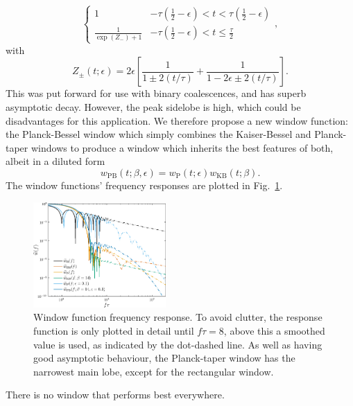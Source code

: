 \documentclass[useAMS,usedcolumn,usegraphicx,usenatbib]{mn2e}
\newcommand{\figref}[1]{Fig.~\ref{fig:#1}}
\newcommand{\sub}[1]{\ensuremath{_\mathrm{#1}}}
\newcommand{\recip}[1]{\ensuremath{\frac{1}{#1}}}
\begin{document}
{\begin{equation}
\begin{cases}
 1 & {\displaystyle -\tau\left(\recip{2} - \epsilon\right) < t < \tau\left(\recip{2} - \epsilon\right)} \\
 {\displaystyle \recip{\exp(Z_-)+1}} & {\displaystyle -\tau\left(\recip{2} - \epsilon\right) < t \leq \frac{\tau}{2}}
\end{cases},
\end{equation}
with
\begin{equation}
Z_\pm(t; \epsilon) = 2\epsilon\left[\recip{1 \pm 2(t/\tau)} + \recip{1 - 2\epsilon \pm 2(t/\tau)}\right].
\end{equation}
This was put forward for use with binary coalescences, and has superb asymptotic decay. However, the peak sidelobe is high, which could be disadvantages for this application. We therefore propose a new window function: the Planck-Bessel window which simply combines the Kaiser-Bessel and Planck-taper windows to produce a window which inherits the best features of both, albeit in a diluted form
\begin{equation}
w\sub{PB}(t;\beta,\epsilon) = w\sub{P}(t; \epsilon)w\sub{KB}(t;\beta).
\end{equation}
The window functions' frequency responses are plotted in \figref{Response}.
\begin{figure}
  \begin{center}
  \includegraphics[width=0.45\textwidth]{Fig_Response}
    \caption{Window function frequency response. To avoid clutter, the response function is only plotted in detail until $f\tau = 8$, above this a smoothed value is used, as indicated by the dot-dashed line. As well as having good asymptotic behaviour, the Planck-taper window has the narrowest main lobe, except for the rectangular window.}
    \label{fig:Response}
  \end{center}
\end{figure}
There is no window that performs best everywhere.

}
\end{document}
